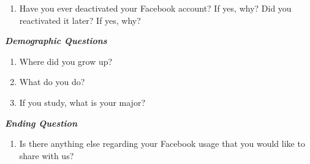 \begin{appendices}
\begin{enumerate}
\item Have you ever deactivated your Facebook account? If yes, why? Did you reactivated it later? If yes, why?
\end{enumerate}
\textbf{\textit{Demographic Questions}}
\begin{enumerate}
\item Where did you grow up?
\item What do you do?
\item If you study, what is your major?
\end{enumerate}
\textbf{\textit{Ending Question}}
\begin{enumerate}
\item Is there anything else regarding your Facebook usage that you would like to share with us?
\end{enumerate}
\end{appendices}